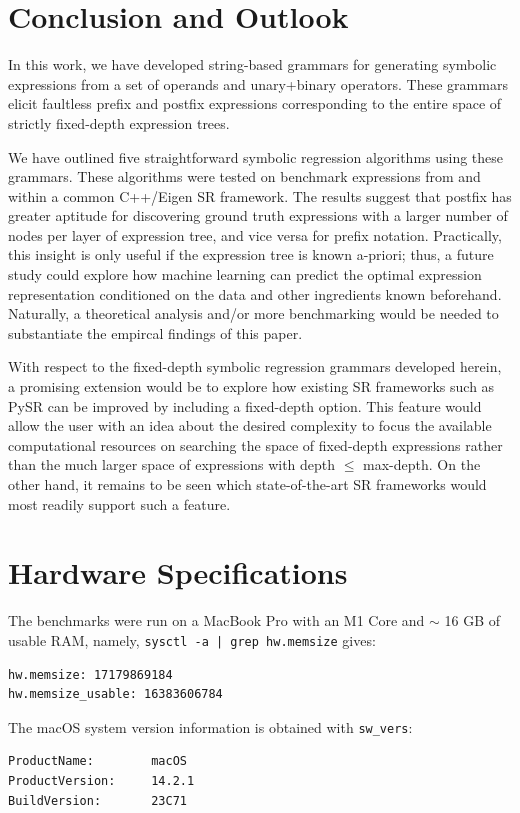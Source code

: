 \documentclass[12pt]{iopart}
\begin{document}
\section{Conclusion and Outlook}
In this work, we have developed string-based grammars for generating symbolic expressions from a set of operands and unary+binary operators. These grammars elicit faultless prefix and postfix expressions corresponding to the entire space of strictly fixed-depth expression trees. 
\par We have outlined five straightforward symbolic regression algorithms using these grammars. These algorithms were tested on benchmark expressions from \cite{hemberg2008pre} and \cite{udrescu2020ai} within a common C++/Eigen SR framework. The results suggest that postfix has greater aptitude for discovering ground truth expressions with a larger number of nodes per layer of expression tree, and vice versa for prefix notation. Practically, this insight is only useful if the expression tree is known a-priori; thus, a future study could explore how machine learning can predict the optimal expression representation conditioned on the data and other ingredients known beforehand. Naturally, a theoretical analysis and/or more benchmarking would be needed to substantiate the empircal findings of this paper. 
\par 
\par With respect to the fixed-depth symbolic regression grammars developed herein, a promising extension would be to explore how existing SR frameworks such as PySR can be improved by including a fixed-depth option. This feature would allow the user with an idea about the desired complexity to focus the available computational resources on searching the space of fixed-depth expressions rather than the much larger space of expressions with depth $\leq$ max-depth. On the other hand, it remains to be seen which state-of-the-art SR frameworks would most readily support such a feature.


\newpage




\newpage

\appendix
\section{Hardware Specifications}
The benchmarks were run on a MacBook Pro with an M1 Core and $\sim$ 16 GB of usable RAM, namely, \texttt{sysctl -a | grep hw.memsize} gives: 
\begin{verbatim}
hw.memsize: 17179869184
hw.memsize_usable: 16383606784
\end{verbatim}
The macOS system version information is obtained with \texttt{sw\_vers}:
\begin{verbatim}
ProductName:		macOS
ProductVersion:		14.2.1
BuildVersion:		23C71
\end{verbatim}
\end{document}
